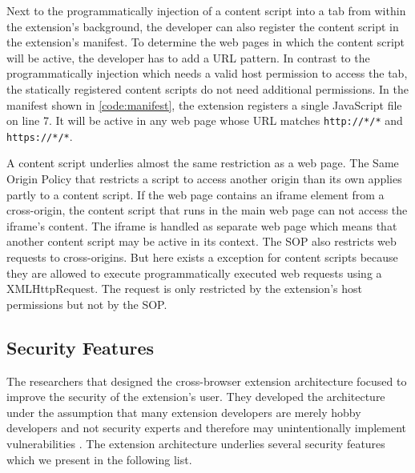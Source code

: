 	Next to the programmatically injection of a content script into a tab from within the extension's background, the developer can also register the content script in the extension's manifest. To determine the web pages in which the content script will be active, the developer has to add a URL pattern. In contrast to the programmatically injection which needs a valid host permission to access the tab, the statically registered content scripts do not need additional permissions. In the manifest shown in \autoref{code:manifest}, the extension registers a single JavaScript file on line 7. It will be active in any web page whose URL matches \texttt{http://*/*} and \texttt{https://*/*}.
	
	A content script underlies almost the same restriction as a web page. The Same Origin Policy that restricts a script to access another origin than its own applies partly to a content script. If the web page contains an iframe element from a cross-origin, the content script that runs in the main web page can not access the iframe's content. The iframe is handled as separate web page which means that another content script may be active in its context. The SOP also restricts web requests to cross-origins. But here exists a exception for content scripts because they are allowed to execute programmatically executed web requests using a XMLHttpRequest. The request is only restricted by the extension's host permissions but not by the SOP. 

\subsection{Security Features}

	The researchers that designed the cross-browser extension architecture focused to improve the security of the extension's user. They developed the architecture under the assumption that many extension developers are merely hobby developers and not security experts and therefore may unintentionally implement vulnerabilities \cite{Barth10protectingbrowsers}. The extension architecture underlies several security features which we present in the following list.
	
